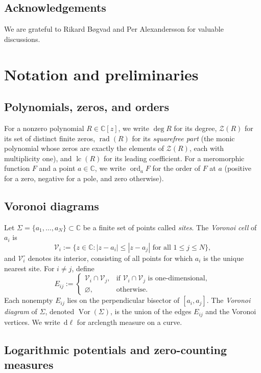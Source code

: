 \documentclass[reqno]{article}
\theoremstyle{definition}
\theoremstyle{remark}
\theoremstyle{plain}
\newcommand{\C}{\mathbb C}
\newcommand{\Z}{\mathcal Z}
\newcommand{\rad}{\operatorname{rad}}
\newcommand{\ord}{\operatorname{ord}}
\newcommand{\lc}{\operatorname{lc}}
\newcommand{\dd}{\,\mathrm d}
\begin{document}
\subsection*{Acknowledgements}
We are grateful to Rikard B\o gvad and Per Alexandersson for valuable discussions.

\section{Notation and preliminaries}\label{sec:prelim}

\subsection{Polynomials, zeros, and orders}

 For a nonzero polynomial $R\in\C[z]$, we write $\deg R$ for its degree, $\Z(R)$ for its set of distinct finite zeros, $\rad(R)$ for its \emph{squarefree part} (the monic polynomial whose zeros are exactly the elements of $\Z(R)$, each with multiplicity one), and $\lc(R)$ for its leading coefficient. For a meromorphic function $F$ and a point $a\in\C$, we write $\ord_a F$ for the order of $F$ at $a$ (positive for a zero, negative for a pole, and zero otherwise).

\subsection{Voronoi diagrams}\label{sec:voronoi}

Let $\Sigma=\{a_1,\dots,a_N\}\subset\C$ be a finite set of points called \emph{sites}. The \emph{Voronoi cell} of $a_i$ is
$$\mathcal V_i:=\bigl\{z\in\C:|z-a_i|\le|z-a_j|\text{ for all } 1\le j\le N\bigr\},$$
and $\mathcal V_i^\circ$ denotes its interior, consisting of all points for which $a_i$ is the unique nearest site. For $i\ne j$, define
$$E_{ij}:=
\begin{cases}
\mathcal V_i\cap\mathcal V_j, & \text{if } \mathcal V_i\cap\mathcal V_j \text{ is one-dimensional},\\
\varnothing, & \text{otherwise}.
\end{cases}$$
Each nonempty $E_{ij}$ lies on the perpendicular bisector of $[a_i,a_j]$. The \emph{Voronoi diagram} of $\Sigma$, denoted $\operatorname{Vor}(\Sigma)$, is the union of the edges $E_{ij}$ and the Voronoi vertices. We write $\dd\ell$ for arclength measure on a curve.


\subsection{Logarithmic potentials and zero-counting measures}
\label{sec:pottheory}
\end{document}
